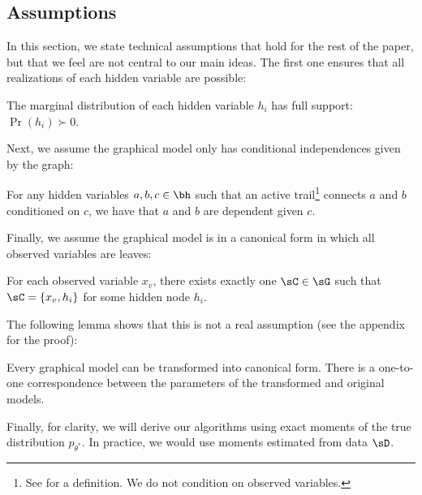 \subsection{Assumptions}

In this section, we state technical assumptions that hold for the rest of the
paper, but that we feel are not central to our main ideas.
The first one ensures that all realizations of each hidden variable are possible:

\begin{assumption}
  \label{asm:non-degeneracy}
  The marginal distribution of each hidden variable $h_i$ has full support: $\Pr(h_i) \succ 0$.
\end{assumption}

Next, we assume the graphical model only has conditional independences given by
the graph:
\begin{assumption}[Faithful]
  \label{asm:faithful}  
  For any hidden variables $a,b,c \in \bh$
  such that an active trail\footnote{See
  \citet{koller2009probabilistic} for a definition.
  We do not condition on observed variables.} connects $a$ and $b$ conditioned on $c$,
  we have that $a$ and $b$ are dependent given $c$. %
\end{assumption}

Finally, we assume the graphical model is in a canonical form
in which all observed variables are leaves:
\begin{assumption}
  \label{asm:canonical}
  For each observed variable $x_v$, there exists exactly one $\sC \in \sG$
  such that $\sC = \{ x_v, h_{i} \}$ for some hidden node $h_{i}$.
\end{assumption}
The following lemma shows that this is not a real assumption (see the appendix for the proof):
\begin{lemma}
\label{lem:reduction}
Every graphical model can be transformed into canonical
form. %
There is a one-to-one correspondence between the parameters of the transformed
and original models.
\end{lemma}

Finally, for clarity, we will derive our algorithms using exact moments of the true
distribution $p_{\theta^*}$.  In practice, we would use moments estimated from data $\sD$.


